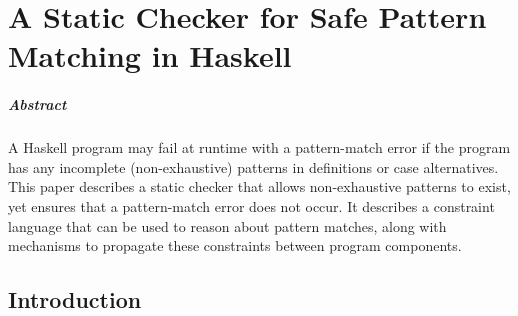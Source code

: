 \documentclass[book]{tfp05symp}
\begin{document}

\chapter{A Static Checker for Safe Pattern Matching in Haskell}



\addtocounter{footnote}{1}







\paragraph{Abstract}
A Haskell program may fail at runtime with a pattern-match error if
the program has any incomplete (non-exhaustive) patterns in
definitions or case alternatives. This paper describes a static
checker that allows non-exhaustive patterns to exist, yet ensures
that a pattern-match error does not occur. It describes a constraint
language that can be used to reason about pattern matches, along
with mechanisms to propagate these constraints between program
components.



\section{Introduction}
\label{sec:introduction}
\end{document}
